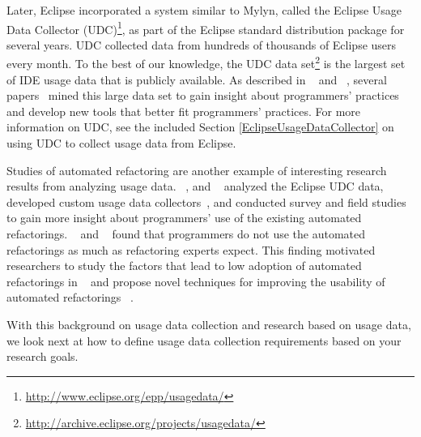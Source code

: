 %
Later, Eclipse incorporated a system similar to Mylyn, called the Eclipse Usage
Data Collector (UDC)\footnote{\url{http://www.eclipse.org/epp/usagedata/}}, as part of the Eclipse standard
distribution package for several years. UDC collected data from hundreds of
thousands of Eclipse users every month. To the best of our knowledge, the UDC
data set\footnote{\url{http://archive.eclipse.org/projects/usagedata/}} is the largest set of IDE usage data that is publicly
available. As described in ~\cite{MurphyHill2012Improving} and ~\cite{VakilianETAL2013Compositional}, several papers~ mined this large
data set to gain insight about programmers' practices and develop new tools that better fit programmers' practices.
For more information on UDC, see the included Section \ref {EclipseUsageDataCollector} on using UDC to collect usage data from Eclipse.

Studies of automated refactoring are another example of interesting research results from analyzing usage data. ~, and ~ analyzed the Eclipse UDC
data, developed
custom usage data collectors~\cite{VakilianETAL2012UseDisuseMisuse}, and
conducted survey and field studies~ to gain more
insight about programmers' use of the existing automated refactorings. ~ and
~
 found that programmers do not use the automated refactorings as
much as refactoring experts expect. This finding motivated researchers to study
the factors that lead to low adoption of automated
refactorings in ~\cite{VakilianETAL2012UseDisuseMisuse,V:MurphyHill2012How} and
propose novel techniques for improving the usability of automated
refactorings
~.

With this background on usage data collection and research based on usage data, we look next at how to define usage data collection requirements based on your research goals.

